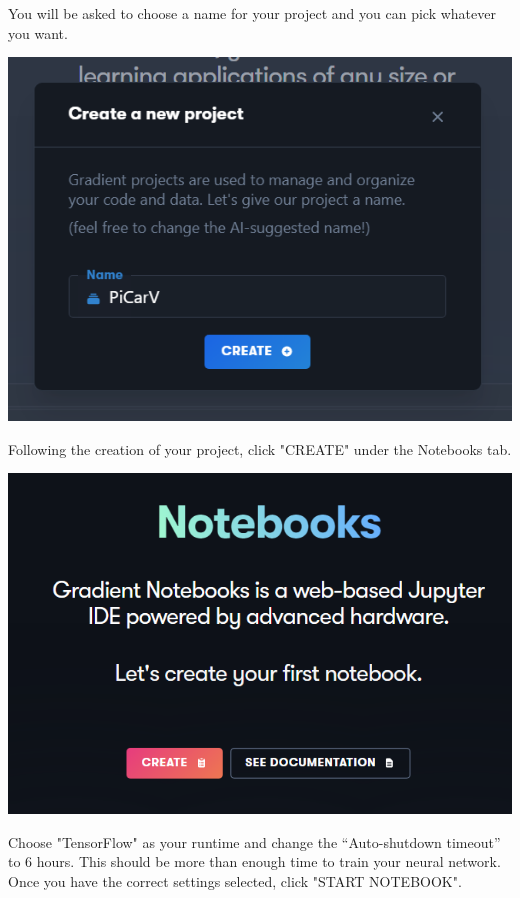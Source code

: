\documentclass[11pt]{report}
\begin{document}
You will be asked to choose a name for your project and you can pick whatever you want.

\begin{center}
    \includegraphics[scale=0.6]{nameproject.png}
\end{center}

Following the creation of your project, click "CREATE" under the Notebooks tab.

\begin{center}
    \includegraphics[scale=0.5]{notebook.png}
\end{center}

Choose "TensorFlow" as your runtime and change the “Auto-shutdown timeout” to 6 hours. This should be more than enough time to train your neural network. Once you have the correct settings selected, click "START NOTEBOOK". 
\end{document}
